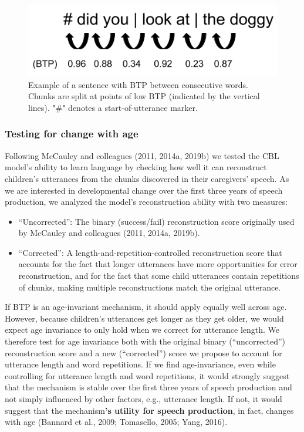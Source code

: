 \documentclass[
  english,
  man,mask,floatsintext]{apa6}
\providecommand{\tightlist}{%
  \setlength{\itemsep}{0pt}\setlength{\parskip}{0pt}}
\begin{document}
\begin{figure}
\includegraphics[width=0.75\linewidth]{images/chunking_mechanism} \caption{Example of a sentence with BTP between consecutive words. Chunks are split at points of low BTP (indicated by the vertical lines). "\#" denotes a start-of-utterance marker.}\label{fig:fig1}
\end{figure}

\hypertarget{testing-for-change-with-age}{%
\subsubsection{\texorpdfstring{\textbf{Testing for change with age}}{Testing for change with age}}\label{testing-for-change-with-age}}

Following McCauley and colleagues (2011, 2014a, 2019b) we tested the CBL model's ability to learn language by checking how well it can reconstruct children's utterances from the chunks discovered in their caregivers' speech. As we are interested in developmental change over the first three years of speech production, we analyzed the model's reconstruction ability with two measures:

\begin{itemize}
\tightlist
\item
  \enquote{Uncorrected}: The binary (success/fail) reconstruction score originally used by McCauley and colleagues (2011, 2014a, 2019b).
\item
  \enquote{Corrected}: A length-and-repetition-controlled reconstruction score that accounts for the fact that longer utterances have more opportunities for error reconstruction, and for the fact that some child utterances contain repetitions of chunks, making multiple reconstructions match the original utterance.
\end{itemize}

If BTP is an age-invariant mechanism, it should apply equally well across age. However, because children's utterances get longer as they get older, we would expect age invariance to only hold when we correct for utterance length. We therefore test for age invariance both with the original binary (\enquote{uncorrected}) reconstruction score and a new (\enquote{corrected}) score we propose to account for utterance length and word repetitions. If we find age-invariance, even while controlling for utterance length and word repetitions, it would strongly suggest that the mechanism is stable over the first three years of speech production and not simply influenced by other factors, e.g., utterance length. If not, it would suggest that the mechanism\textbf{'s utility for speech production}, in fact, changes with age (Bannard et al., 2009; Tomasello, 2005; Yang, 2016).
\end{document}
